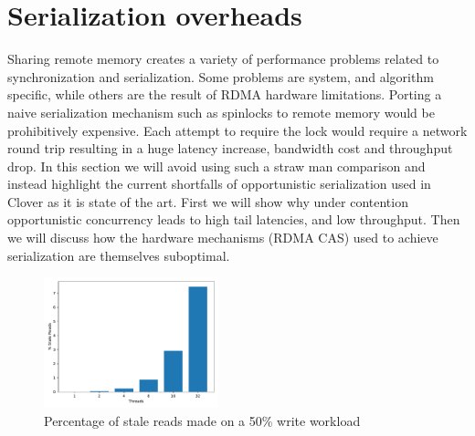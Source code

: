 \section{Serialization overheads}



Sharing remote memory creates a variety of performance problems related to
synchronization and serialization. Some problems are system, and algorithm
specific, while others are the result of RDMA hardware limitations.  Porting a
naive serialization mechanism such as spinlocks to remote memory would be
prohibitively expensive. Each attempt to require the lock would require a
network round trip resulting in a huge latency increase, bandwidth cost and
throughput drop. In this section we will avoid using such a straw man comparison
and instead highlight the current shortfalls of opportunistic serialization used
in Clover as it is state of the art. First we will show why under contention
opportunistic concurrency leads to high tail latencies, and low throughput. Then
we will discuss how the hardware mechanisms (RDMA CAS) used to achieve
serialization are themselves suboptimal.


\begin{figure}[t]
    \includegraphics[width=0.45\textwidth]{fig/stale_reads.pdf}
    \caption{Percentage of stale reads made on a 50\% write workload }
    \label{fig:stale_reads}
\end{figure}

